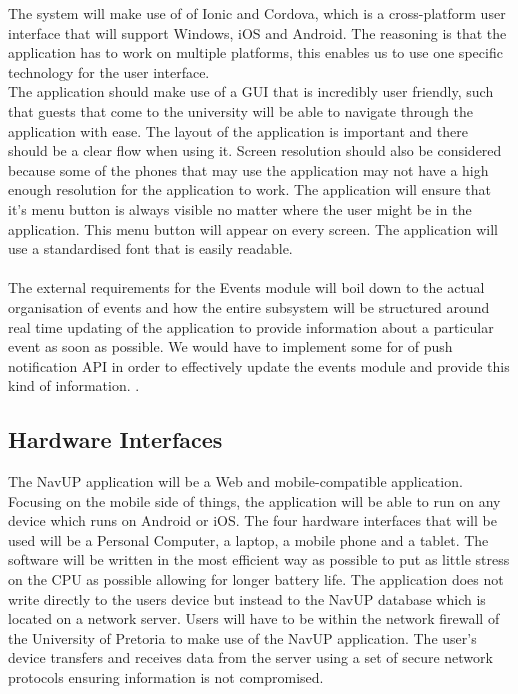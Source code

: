 \documentclass{article}
\begin{document}
The system will make use of of Ionic and Cordova, which is a cross-platform user interface that will support Windows, iOS and Android. The reasoning is that the application has to work on multiple platforms, this enables us to use one specific technology for the user interface.\\

The application should make use of a GUI that is incredibly user friendly, such that guests that come to the university will be able to navigate through the application with ease. The layout of the application is important and there should be a clear flow when using it. Screen resolution should also be considered because some of the phones that may use the application may not have a high enough resolution for the application to work. The application will ensure that it's menu button is always visible no matter where the user might be in the application. This menu button will appear on every screen. The application will use a standardised font that is easily readable.\\\\
The external requirements for the Events module will boil down to the actual organisation of events and how the entire subsystem will be structured around real time updating of the application to provide information about a particular event as soon as possible. We would have to implement some for of push notification API in order to effectively update the events module and provide this kind of information.
.	
	\subsection{Hardware Interfaces}
	
	The NavUP application will be a Web and mobile-compatible application. Focusing on the mobile side of things, the application will be able to run on any
device which runs on Android or iOS. The four hardware interfaces that will be used will be a Personal Computer, a laptop, a mobile phone and a tablet. The software will be written in the most efficient way as possible to put as little stress on the CPU as possible
allowing for longer battery life. The application does not write directly to the users device but instead to the NavUP database which is located on a 
network server. Users will have to be within the network firewall of the University of Pretoria to make use of the NavUP application. The user's device
transfers and receives data from the server using a set of secure network protocols ensuring information is not compromised.
\end{document}
